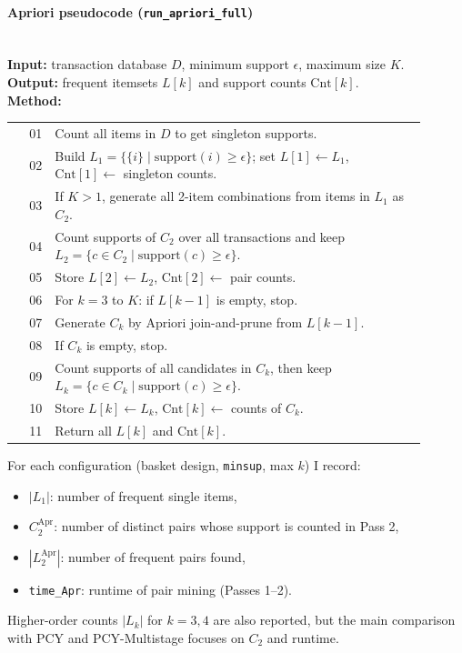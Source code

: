 \documentclass{article}  %
\begin{document}
\paragraph{Apriori pseudocode (\texttt{run\_apriori\_full})}\mbox{}\\
\textbf{Input:} transaction database \(D\), minimum support \(\epsilon\), maximum size \(K\).\\
\textbf{Output:} frequent itemsets \(L[k]\) and support counts \(\mathrm{Cnt}[k]\).\\
\textbf{Method:}
    \begin{small}
    \begin{tabular}{@{}r p{0.90\linewidth}@{}}
    01 & Count all items in \(D\) to get singleton supports. \\
    02 & Build \(L_1 = \{\{i\}\mid \mathrm{support}(i)\ge \epsilon\}\); set \(L[1]\leftarrow L_1\), \(\mathrm{Cnt}[1]\leftarrow\) singleton counts. \\
    03 & If \(K>1\), generate all 2-item combinations from items in \(L_1\) as \(C_2\). \\
    04 & Count supports of \(C_2\) over all transactions and keep \(L_2=\{c\in C_2\mid \mathrm{support}(c)\ge \epsilon\}\). \\
    05 & Store \(L[2]\leftarrow L_2\), \(\mathrm{Cnt}[2]\leftarrow\) pair counts. \\
    06 & For \(k=3\) to \(K\): if \(L[k-1]\) is empty, stop. \\
    07 & Generate \(C_k\) by Apriori join-and-prune from \(L[k-1]\). \\
    08 & If \(C_k\) is empty, stop. \\
    09 & Count supports of all candidates in \(C_k\), then keep \(L_k=\{c\in C_k\mid \mathrm{support}(c)\ge \epsilon\}\). \\
    10 & Store \(L[k]\leftarrow L_k\), \(\mathrm{Cnt}[k]\leftarrow\) counts of \(C_k\). \\
    11 & Return all \(L[k]\) and \(\mathrm{Cnt}[k]\). \\
    \end{tabular}
\end{small}

For each configuration (basket design, \verb|minsup|, max \(k\)) I record:
\begin{itemize}
    \item \(|L_1|\): number of frequent single items,
    \item \(C_2^{\text{Apr}}\): number of distinct pairs whose support is counted in Pass 2,
    \item \(|L_2^{\text{Apr}}|\): number of frequent pairs found,
    \item \verb|time_Apr|: runtime of pair mining (Passes 1--2).
\end{itemize}
Higher-order counts \(|L_k|\) for \(k=3,4\) are also reported, but the main comparison with PCY and PCY-Multistage focuses on \(C_2\) and runtime.
\end{document}
